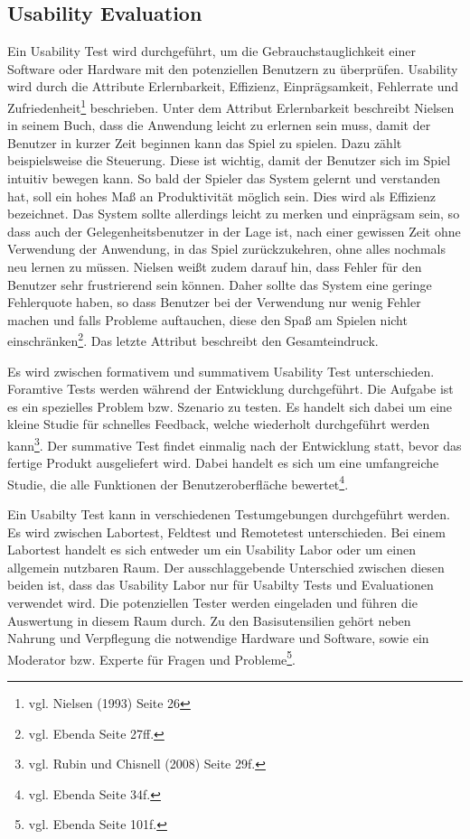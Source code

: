 		\subsection{Usability Evaluation}
			Ein Usability Test wird durchgeführt, um die Gebrauchstauglichkeit einer Software oder Hardware mit den potenziellen Benutzern zu überprüfen. Usability wird durch die Attribute Erlernbarkeit, Effizienz, Einprägsamkeit, Fehlerrate und Zufriedenheit\footnote{vgl. Nielsen \cite{NielsenUI} (1993) Seite 26} beschrieben. Unter dem Attribut Erlernbarkeit beschreibt Nielsen in seinem Buch, dass die Anwendung leicht zu erlernen sein muss, damit der Benutzer in kurzer Zeit beginnen kann das Spiel zu spielen. Dazu zählt beispielsweise die Steuerung. Diese ist wichtig, damit der Benutzer sich im Spiel intuitiv bewegen kann. So bald der Spieler das System gelernt und verstanden hat, soll ein hohes Maß an Produktivität möglich sein. Dies wird als Effizienz bezeichnet. Das System sollte allerdings leicht zu merken und einprägsam sein, so dass auch der Gelegenheitsbenutzer in der Lage ist, nach einer gewissen Zeit ohne Verwendung der Anwendung, in das Spiel zurückzukehren, ohne alles nochmals neu lernen zu müssen. Nielsen weißt zudem darauf hin, dass Fehler für den Benutzer sehr frustrierend sein können. Daher sollte das System eine geringe Fehlerquote haben, so dass Benutzer bei der Verwendung nur wenig Fehler machen und falls Probleme auftauchen, diese den Spaß am Spielen nicht einschränken\footnote{vgl. Ebenda Seite 27ff.}. Das letzte Attribut beschreibt den Gesamteindruck.

			Es wird zwischen formativem und summativem Usability Test unterschieden. Foramtive Tests werden während der Entwicklung durchgeführt. Die Aufgabe ist es ein spezielles Problem bzw. Szenario zu testen. Es handelt sich dabei um eine kleine Studie für schnelles Feedback, welche wiederholt durchgeführt werden kann\footnote{vgl. Rubin und Chisnell \cite{handbookUsability} (2008) Seite 29f.}. Der summative Test findet einmalig nach der Entwicklung statt, bevor das fertige Produkt ausgeliefert wird. Dabei handelt es sich um eine umfangreiche Studie, die alle Funktionen der Benutzeroberfläche bewertet\footnote{vgl. Ebenda Seite 34f.}.

			Ein Usabilty Test kann in verschiedenen Testumgebungen durchgeführt werden. Es wird zwischen Labortest, Feldtest und Remotetest unterschieden. Bei einem Labortest handelt es sich entweder um ein Usability Labor oder um einen allgemein nutzbaren Raum. Der ausschlaggebende Unterschied zwischen diesen beiden ist, dass das Usability Labor nur für Usabilty Tests und Evaluationen verwendet wird. Die potenziellen Tester werden eingeladen und führen die Auswertung in diesem Raum durch. Zu den Basisutensilien gehört neben Nahrung und Verpflegung die notwendige Hardware und Software, sowie ein Moderator bzw. Experte für Fragen und Probleme\footnote{vgl. Ebenda Seite 101f.}. 
			
